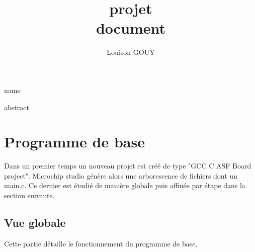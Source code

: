 \documentclass[a4paper]{article}
\title{\textbf{projet} \\ document}
\author{Louison GOUY}
\begin{document}
\maketitle

\vspace{2cm}

\begin{center}
\end{center}

\vspace*{1cm}

\begin{center}
    name
\end{center}

\vspace*{7cm}

\begin{center}

abstract

\end{center}
\newpage
\renewcommand{\contentsname}{Table des Matières}
\tableofcontents
\newpage
\renewcommand\listfigurename{Liste des figures}
\listoffigures
\newpage


\section{Programme de base} %

Dans un premier temps un nouveau projet est créé de type "GCC C ASF Board project". Microchip studio génère alors une arborescence de fichiers dont un main.c. Ce dernier est étudié de manière globale puis affinée par étape dans la section suivante.

\subsection{Vue globale}
Cette partie détaille le fonctionnement du programme de base. 
\end{document}
